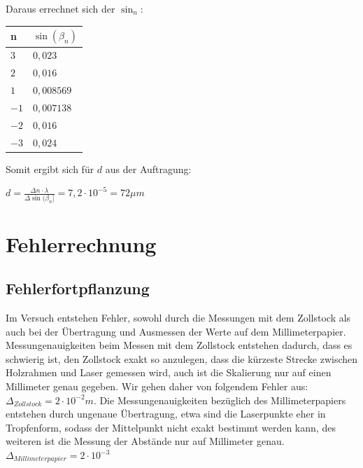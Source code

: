 \documentclass[12pt,a4paper,titlepage,headinclude,bibtotoc]{scrartcl}
\begin{document}
\vspace{3 cm}

Daraus errechnet sich der $\sin_n$:


\begin{table} [h!]
\centering
\begin{tabular}{|p{4 cm}||p{4 cm}|}
        \hline
		n & $\sin(\beta_n)$ \\
         \hline 
         $3$ & $0,023$  \\
         \hline
         $2$ & $0,016$ \\
         \hline
         $1$ & $0,008569$\\
         \hline
         $-1$ & $0,007138$   \\
         \hline
         $-2$ & $0,016$  \\
         \hline             
         $-3$ & $0,024$   \\
         \hline
\end{tabular}
\end{table}



Somit ergibt sich für $d$ aus der Auftragung:

$ d= \frac{\Delta n \cdot \lambda}{\Delta \sin(\beta_n]} = 7,2\cdot 10^{-5} = 72\mu m $





\section{Fehlerrechnung}
\subsection{Fehlerfortpflanzung}
Im Versuch entstehen Fehler, sowohl durch die Messungen mit dem Zollstock als auch bei der Übertragung und Ausmessen der Werte auf dem Millimeterpapier. Messungenauigkeiten beim Messen mit dem Zollstock entstehen dadurch, dass es schwierig ist, den Zollstock exakt so anzulegen, dass die kürzeste Strecke zwischen Holzrahmen und Laser gemessen wird, auch ist die Skalierung nur auf einen Millimeter genau gegeben. Wir gehen daher von folgendem Fehler aus: $\Delta_{Zollstock}={2} \cdot{10^{-2}}m$. Die Messungenauigkeiten bezüglich des Millimeterpapiers entstehen durch ungenaue Übertragung, etwa sind die Laserpunkte eher in Tropfenform, sodass der Mittelpunkt nicht exakt bestimmt werden kann, des weiteren ist die Messung der Abstände nur auf Millimeter genau. $\Delta_{Millimeterpapier}={2} \cdot {10^{-3}}$ \\
\end{document}
